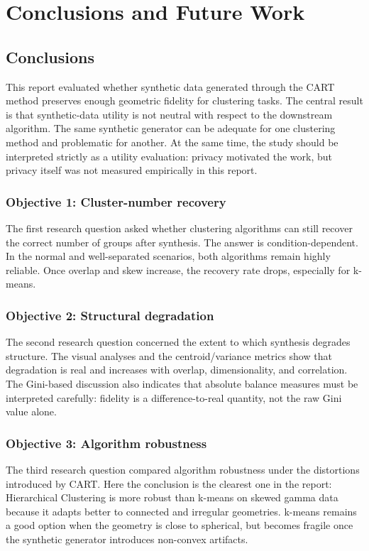 \chapter{Conclusions and Future Work}
\label{chap:conclusions-future-work}

\section{Conclusions}
\label{sec:conclusions}

This report evaluated whether synthetic data generated through the CART method preserves enough geometric fidelity for clustering tasks. The central result is that synthetic-data utility is not neutral with respect to the downstream algorithm. The same synthetic generator can be adequate for one clustering method and problematic for another. At the same time, the study should be interpreted strictly as a utility evaluation: privacy motivated the work, but privacy itself was not measured empirically in this report.

\subsection*{Objective 1: Cluster-number recovery}
The first research question asked whether clustering algorithms can still recover the correct number of groups after synthesis. The answer is condition-dependent. In the normal and well-separated scenarios, both algorithms remain highly reliable. Once overlap and skew increase, the recovery rate drops, especially for k-means.

\subsection*{Objective 2: Structural degradation}
The second research question concerned the extent to which synthesis degrades structure. The visual analyses and the centroid/variance metrics show that degradation is real and increases with overlap, dimensionality, and correlation. The Gini-based discussion also indicates that absolute balance measures must be interpreted carefully: fidelity is a difference-to-real quantity, not the raw Gini value alone.

\subsection*{Objective 3: Algorithm robustness}
The third research question compared algorithm robustness under the distortions introduced by CART. Here the conclusion is the clearest one in the report: Hierarchical Clustering is more robust than k-means on skewed gamma data because it adapts better to connected and irregular geometries. k-means remains a good option when the geometry is close to spherical, but becomes fragile once the synthetic generator introduces non-convex artifacts.

